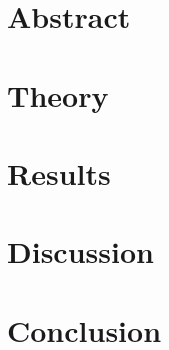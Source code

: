 \documentclass[DIGIC]{KGCOEReport}
\begin{document}
\maketitle

\section*{Abstract}

\section*{Theory}

\section*{Results}

\section*{Discussion}

\section*{Conclusion}
\end{document}
